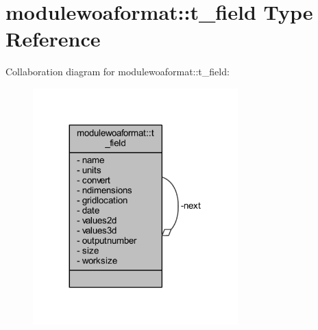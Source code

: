 \hypertarget{structmodulewoaformat_1_1t__field}{}\section{modulewoaformat\+:\+:t\+\_\+field Type Reference}
\label{structmodulewoaformat_1_1t__field}


Collaboration diagram for modulewoaformat\+:\+:t\+\_\+field\+:\nopagebreak
\begin{figure}[H]
\begin{center}
\leavevmode
\includegraphics[width=224pt]{structmodulewoaformat_1_1t__field__coll__graph}
\end{center}
\end{figure}
